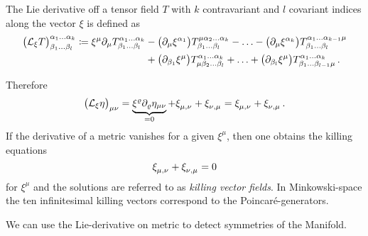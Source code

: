 \begin{definition}
    The Lie derivative off a tensor field $T$ with $k$ contravariant and $l$
    covariant indices along the vector $\xi$ is defined as
    \begin{equation}
        \begin{split}
            \left( \liedif{\xi}{T} \right)^{\alpha_1\ldots\alpha_k}_{\beta_1\ldots\beta_l}
            \coloneqq \xi^\mu \partial_\mu T^{\alpha_1\ldots\alpha_k}_{\beta_1\ldots\beta_l}
            & - \left( \partial_\mu \xi^{\alpha_1} \right) T^{\mu\alpha_2\ldots\alpha_k}_{\beta_1\ldots\beta_l} - \ldots
            - \left( \partial_\mu \xi^{\alpha_k} \right) T^{\alpha_1\ldots\alpha_{k-1}\mu}_{\beta_1\ldots\beta_l} \\
            & + \left( \partial_{\beta_1} \xi^\mu \right) T^{\alpha_1\ldots\alpha_k}_{\mu\beta_2\ldots\beta_l} + \ldots
            +  \left( \partial_{\beta_l} \xi^\mu \right)
            T^{\alpha_1\ldots\alpha_k}_{\beta_1\ldots\beta_{l-1}\mu}\,.
        \end{split}
    \end{equation}
\end{definition}
Therefore
\begin{equation}
    \left( \liedif{\xi}{\eta} \right)_{\mu\nu} = \underbrace{\xi^\varrho\partial_\varrho\eta_{\mu\nu}}_{=0}
    + \tensor{\xi}{_\mu_,_\nu} + \tensor{\xi}{_\nu_,_\mu} =
    \tensor{\xi}{_\mu_,_\nu} + \tensor{\xi}{_\nu_,_\mu}\,.
\end{equation}
If the derivative of a metric vanishes for a given $\xi^\mu$, then one obtains
the killing equations 
\begin{equation}
    \tensor{\xi}{_\mu_,_\nu} + \tensor{\xi}{_\nu_,_\mu}=0  %
\end{equation}
for $\xi^\mu$ and the solutions are referred to as \emph{killing vector fields}.
In Minkowski-space the ten infinitesimal killing vectors correspond to the Poincaré-generators.
\begin{sidenote}
We can use the Lie-derivative on metric to detect symmetries of the Manifold.
\end{sidenote}
